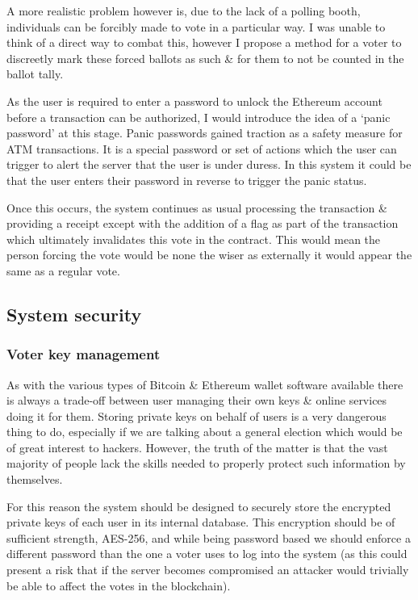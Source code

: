\documentclass{article}
\begin{document}
	A more realistic problem however is, due to the lack of a polling booth, individuals can be forcibly made to vote in a particular way. I was unable to think of a direct way to combat this, however I propose a method for a voter to discreetly mark these forced ballots as such \& for them to not be counted in the ballot tally.
	
	As the user is required to enter a password to unlock the Ethereum account before a transaction can be authorized, I would introduce the idea of a `panic password' at this stage. Panic passwords gained traction as a safety measure for ATM transactions. It is a special password or set of actions which the user can trigger to alert the server that the user is under duress. In this system it could be that the user enters their password in reverse to trigger the panic status.
	
	Once this occurs, the system continues as usual processing the transaction \& providing a receipt except with the addition of a flag as part of the transaction which ultimately invalidates this vote in the contract. This would mean the person forcing the vote would be none the wiser as externally it would appear the same as a regular vote.	
	
	\cleardoublepage
	\subsection{System security}
	\subsubsection{Voter key management}
	As with the various types of Bitcoin \& Ethereum wallet software available there is always a trade-off between user managing their own keys \& online services doing it for them. Storing private keys on behalf of users is a very dangerous thing to do, especially if we are talking about a general election which would be of great interest to hackers. However, the truth of the matter is that the vast majority of people lack the skills needed to properly protect such information by themselves.
	
	For this reason the system should be designed to securely store the encrypted private keys of each user in its internal database. This encryption should be of sufficient strength, AES-256, and while being password based we should enforce a different password than the one a voter uses to log into the system (as this could present a risk that if the server becomes compromised an attacker would trivially be able to affect the votes in the blockchain).
\end{document}

